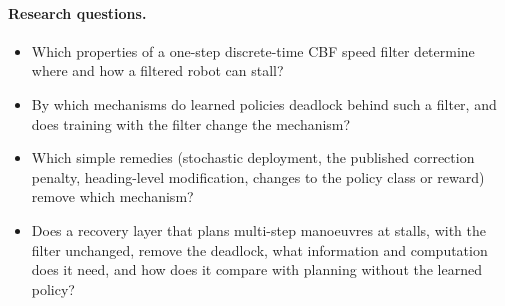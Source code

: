 \documentclass[11pt]{article}
\theoremstyle{definition}
\theoremstyle{remark}
\begin{document}
\paragraph{Research questions.}
\begin{itemize}
  \item[RQ1] Which properties of a one-step discrete-time CBF speed filter determine where and how a filtered robot can stall?
  \item[RQ2] By which mechanisms do learned policies deadlock behind such a filter, and does training with the filter change the mechanism?
  \item[RQ3] Which simple remedies (stochastic deployment, the published correction penalty, heading-level modification, changes to the policy class or reward) remove which mechanism?
  \item[RQ4] Does a recovery layer that plans multi-step manoeuvres at stalls, with the filter unchanged, remove the deadlock, what information and computation does it need, and how does it compare with planning without the learned policy?
\end{itemize}
\end{document}

